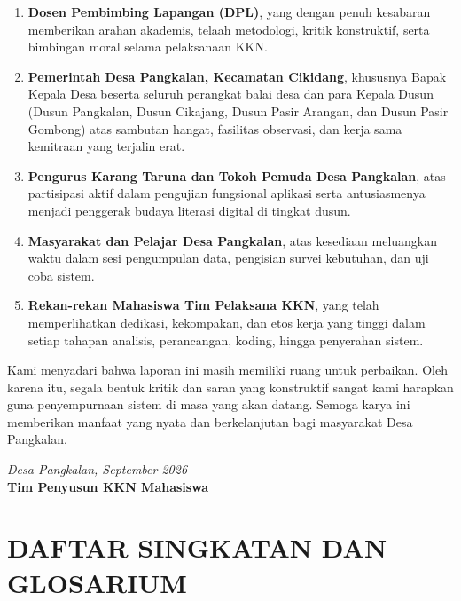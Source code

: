 \documentclass[
  indonesian,
  12pt,
]{report}
\providecommand{\tightlist}{%
  \setlength{\itemsep}{0pt}\setlength{\parskip}{0pt}}
\begin{document}
\begin{enumerate}
\def\labelenumi{\arabic{enumi}.}
\tightlist
\item
  \textbf{Dosen Pembimbing Lapangan (DPL)}, yang dengan penuh kesabaran
  memberikan arahan akademis, telaah metodologi, kritik konstruktif,
  serta bimbingan moral selama pelaksanaan KKN.
\item
  \textbf{Pemerintah Desa Pangkalan, Kecamatan Cikidang}, khususnya
  Bapak Kepala Desa beserta seluruh perangkat balai desa dan para Kepala
  Dusun (Dusun Pangkalan, Dusun Cikajang, Dusun Pasir Arangan, dan Dusun
  Pasir Gombong) atas sambutan hangat, fasilitas observasi, dan kerja
  sama kemitraan yang terjalin erat.
\item
  \textbf{Pengurus Karang Taruna dan Tokoh Pemuda Desa Pangkalan}, atas
  partisipasi aktif dalam pengujian fungsional aplikasi serta
  antusiasmenya menjadi penggerak budaya literasi digital di tingkat
  dusun.
\item
  \textbf{Masyarakat dan Pelajar Desa Pangkalan}, atas kesediaan
  meluangkan waktu dalam sesi pengumpulan data, pengisian survei
  kebutuhan, dan uji coba sistem.
\item
  \textbf{Rekan-rekan Mahasiswa Tim Pelaksana KKN}, yang telah
  memperlihatkan dedikasi, kekompakan, dan etos kerja yang tinggi dalam
  setiap tahapan analisis, perancangan, koding, hingga penyerahan
  sistem.
\end{enumerate}

Kami menyadari bahwa laporan ini masih memiliki ruang untuk perbaikan.
Oleh karena itu, segala bentuk kritik dan saran yang konstruktif sangat
kami harapkan guna penyempurnaan sistem di masa yang akan datang. Semoga
karya ini memberikan manfaat yang nyata dan berkelanjutan bagi
masyarakat Desa Pangkalan.

\vspace{1.2cm}

\emph{Desa Pangkalan, September 2026}\\
\vspace{0.8cm} \textbf{Tim Penyusun KKN Mahasiswa}

\newpage

\chapter*{DAFTAR SINGKATAN DAN
GLOSARIUM}\label{daftar-singkatan-dan-glosarium}
\end{document}

